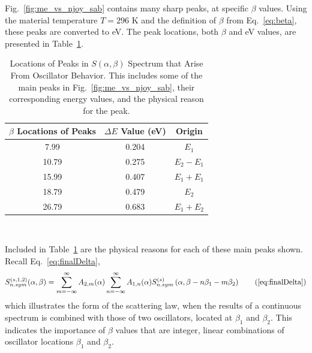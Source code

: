 \documentclass[Master.tex]{subfiles}
\begin{document}
    Fig.~\ref{fig:me_vs_njoy_sab} contains many sharp peaks, at specific $\beta$ values. Using the material temperature $T=296$ K and the definition of $\beta$ from Eq.~\ref{eq:beta}, these peaks are converted to eV. The peak locations, both $\beta$ and eV values, are presented in Table~\ref{tab:spikeLocations}.
  \begin{table}[h]
    \centering
    \caption[Locations of Peaks in $S(\alpha,\beta)$ Spectrum that Arise From Oscillator Behavior]{Locations of Peaks in $S(\alpha,\beta)$ Spectrum that Arise From Oscillator Behavior. This includes some of the main peaks in Fig.~\ref{fig:me_vs_njoy_sab}, their corresponding energy values, and the physical reason for the peak. }%
    \label{tab:spikeLocations}
    \begin{tabular}{ |c|c|c| }\hline
      $\beta$ Locations of Peaks& $\Delta E$ Value (eV) & Origin \\\hline
      7.99  & 0.204 & $E_1$ \\\hline
      10.79 & 0.275 & $E_2-E_1$ \\\hline
      15.99 & 0.407 & $E_1+E_1$ \\\hline
      18.79 & 0.479 & $E_2$ \\\hline
      26.79 & 0.683 & $E_1+E_2$ \\\hline
    \end{tabular}\\[1ex]
  \end{table}
  Included in Table~\ref{tab:spikeLocations} are the physical reasons for each of these main peaks shown. Recall Eq.~\ref{eq:finalDelta}, 
  \begin{equation}
S^{(s,1,2)}_{n.sym}(\alpha,\beta)=\sum_{m=-\infty}^{\infty}A_{2,m}(\alpha)\sum_{n=-\infty}^{\infty}A_{1,n}(\alpha)S^{(s)}_{n.sym}\left(\alpha,\beta-n\beta_1-m\beta_2\right)\tag{\ref{eq:finalDelta}}
  \end{equation}
  which illustrates the form of the scattering law, when the results of a continuous spectrum is combined with those of two oscillators, located at $\beta_1$ and $\beta_2$. This indicates the importance of $\beta$ values that are integer, linear combinations of oscillator locations $\beta_1$ and $\beta_2$.
\end{document}
